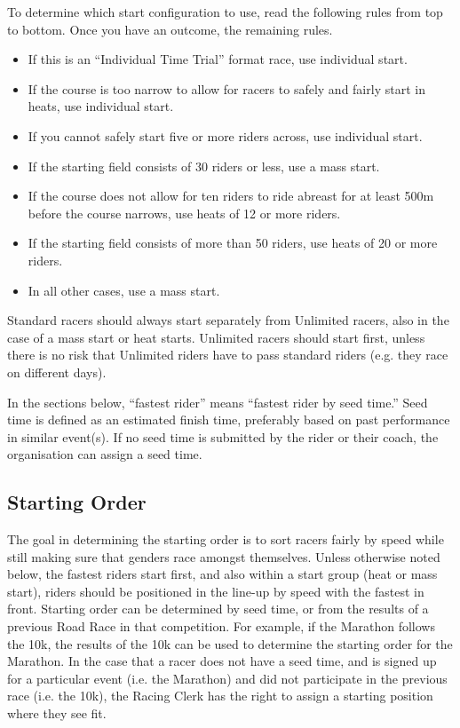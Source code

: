 To determine which start configuration to use, read the following rules from top to bottom.
Once you have an outcome,  the remaining rules.
\begin{itemize}
\item If this is an ``Individual Time Trial'' format race, use individual start.
\item If the course is too narrow to allow for racers to safely and fairly start in heats, use individual start.
\item If you cannot safely start five or more riders across, use individual start.
\item If the starting field consists of 30 riders or less, use a mass start.
\item If the course does not allow for ten riders to ride abreast for at least 500m before the course narrows, use heats of 12 or more riders.
\item If the starting field consists of more than 50 riders, use heats of 20 or more riders.
\item In all other cases, use a mass start.
\end{itemize}
Standard racers should always start separately from Unlimited racers, also in the case of a mass start or heat starts.
Unlimited racers should start first, unless there is no risk that Unlimited riders have to pass standard riders (e.g. they race on different days).

In the sections below, ``fastest rider'' means ``fastest rider by seed time.'' Seed time is defined as an estimated finish time, preferably based on past performance in similar event(s).
If no seed time is submitted by the rider or their coach, the organisation can assign a seed time.

\subsection{Starting Order}
The goal in determining the starting order is to sort racers fairly by speed while still making sure that genders race amongst themselves.
Unless otherwise noted below, the fastest riders start first, and also within a start group (heat or mass start), riders should be positioned in the line-up by speed with the fastest in front.
Starting order can be determined by seed time, or from the results of a previous Road Race in that competition.
For example, if the Marathon follows the 10k, the results of the 10k can be used to determine the starting order for the Marathon.
In the case that a racer does not have a seed time, and is signed up for a particular event (i.e. the Marathon) and did not participate in the previous race (i.e. the 10k), the Racing Clerk has the right to assign a starting position where they see fit.

